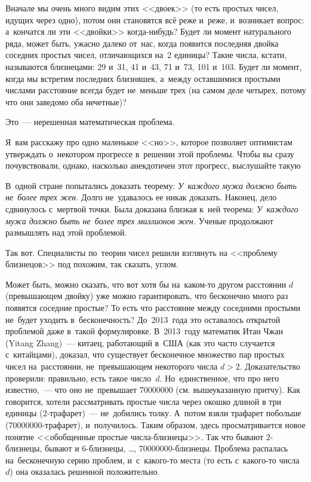 Вначале мы очень много видим этих <<двоек>> (то есть простых чисел, идущих через одно),
потом они становятся всё реже и~реже, и~возникает вопрос:
а~кончатся ли эти <<двойки>> когда-нибудь? Будет ли момент натурального ряда, может быть, ужасно далеко
от~нас, когда появится последняя двойка соседних простых чисел, отличающихся на~2 единицы? Такие
числа, кстати, называются близнецами: 29 и~31, 41 и~43, 71 и~73, 101 и~103. Будет ли момент, когда мы
встретим последних близняшек, а~между оставшимися простыми числами расстояние всегда будет
не~меньше трех (на самом деле четырех, потому что они заведомо оба нечетные)?


Это~--- нерешенная математическая проблема.

Я~вам расскажу про одно маленькое <<но>>, которое
позволяет оптимистам утверждать о~некотором прогрессе в~решении этой проблемы. Чтобы вы сразу
почувствовали, однако, насколько анекдотичен этот прогресс, выслушайте такую 

В~одной стране попытались доказать теорему: \textit{У~каждого мужа должно быть не~более трех жен.} Долго
не~удавалось ее никак доказать. Наконец, дело сдвинулось с~мертвой точки. Была доказана близкая
к~ней теорема: \textit{У~каждого мужа должно быть не~более трех миллионов жен.} Ученые продолжают размышлять
над этой проблемой.

Так вот. Специалисты по~теории чисел решили взглянуть на <<проблему близнецов>> под похожим, так сказать, углом.

Может быть, можно сказать, что вот хотя бы на~каком-то другом расстоянии $d$ (превышающем двойку) уже
можно гарантировать, что бесконечно много раз появятся соседние простые? То есть что расстояние между
соседними простыми не~будет уходить
в~бесконечность? До~2013~года это оставалось открытой проблемой даже в~такой формулировке. В~2013~году
математик Итан Чжан (Yitang Zhang)~--- китаец, работающий в~США (как это часто случается
с~китайцами), доказал, что существует бесконечное множество пар простых чисел на~расстоянии,
не~превышающем некоторого числа $d>2$.
 Доказательство проверили: правильно, есть такое число~$d$.
Но~единственное, что про него известно,~--- что оно не~превышает 70000000 (см. вышеуказанную
притчу). Как говорится, хотели рассматривать простые числа через окошко длиной в три единицы
(2-трафарет)~--- не~добились толку. А~потом взяли трафарет побольше (70000000-трафарет),
и~получилось. Таким образом, здесь просматривается новое понятие <<обобщенные простые
числа-близнецы>>. Так что бывают 2-близнецы,
бывают и 6-близнецы, \ldots, 70000000-близнецы. Проблема распалась на~бесконечную серию
проблем, и~с~какого-то места (то есть с~какого-то числа~$d$) она оказалась решенной положительно.

